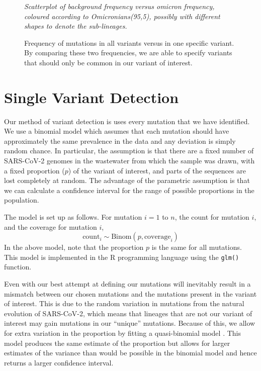 \documentclass{article}
\begin{document}
\begin{figure}[ht!]
\vspace{2cm}
\centering
\emph{Scatterplot of background frequency versus omicron frequency, coloured according to Omicronians(95,5), possibly with different shapes to denote the sub-lineages.}
\vspace{2cm}
\caption{Frequency of mutations in all variants versus in one specific variant. By comparing these two frequencies, we are able to specify variants that should only be common in our variant of interest.}
\label{fig:mutation_frequency}
\end{figure}






\section{Single Variant Detection}

Our method of variant detection is uses every mutation that we have identified.
We use a binomial model which assumes that each mutation should have approximately the same prevalence in the data and any deviation is simply random chance.
In particular, the assumption is that there are a fixed number of SARS-CoV-2 genomes in the wastewater from which the sample was drawn, with a fixed proportion ($p$) of the variant of interest, and parts of the sequences are lost completely at random.
The advantage of the parametric assumption is that we can calculate a confidence interval for the range of possible proportions in the population.

The model is set up as follows.
For mutation $i=1$ to $n$, the count for mutation $i$, and the coverage for mutation $i$,
\begin{equation}
\textrm{count}_i \sim \textrm{Binom}(p, \textrm{coverage}_i)
\end{equation}
In the above model, note that the proportion $p$ is the same for all mutations.
This model is implemented in the R programming language using the \texttt{glm()} function.

Even with our best attempt at defining our mutations will inevitably result in a mismatch between our chosen mutations and the mutations present in the variant of interest.
This is due to the random variation in mutations from the natural evolution of SARS-CoV-2, which means that lineages that are not our variant of interest may gain mutations in our ``unique'' mutations.
Because of this, we allow for extra variation in the proportion by fitting a quasi-binomial model \cite{needed}. %
This model produces the same estimate of the proportion but allows for larger estimates of the variance than would be possible in the binomial model and hence returns a larger confidence interval. 
\end{document}
